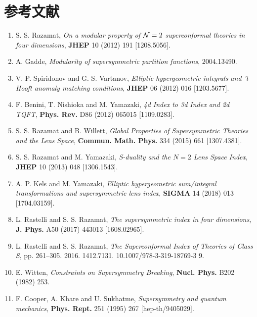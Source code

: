 \section{参考文献}
\begin{enumerate}
\item[{[1]}] S. S. Razamat, \textit{On a modular property of $\mathcal{N}=2$ superconformal theories in four dimensions}, \textbf{JHEP} 10 (2012) 191 [1208.5056].
\item[{[2]}] A. Gadde, \textit{Modularity of supersymmetric partition functions}, 2004.13490.
\item[{[3]}] V. P. Spiridonov and G. S. Vartanov, \textit{Elliptic hypergeometric integrals and 't Hooft anomaly matching conditions}, \textbf{JHEP} 06 (2012) 016 [1203.5677].
\item[{[4]}] F. Benini, T. Nishioka and M. Yamazaki, \textit{4d Index to 3d Index and 2d TQFT}, \textbf{Phys. Rev.} D86 (2012) 065015 [1109.0283].
\item[{[5]}] S. S. Razamat and B. Willett, \textit{Global Properties of Supersymmetric Theories and the Lens Space}, \textbf{Commun. Math. Phys.} 334 (2015) 661 [1307.4381].
\item[{[6]}] S. S. Razamat and M. Yamazaki, \textit{S-duality and the $N=2$ Lens Space Index}, \textbf{JHEP} 10 (2013) 048 [1306.1543].
\item[{[7]}] A. P. Kels and M. Yamazaki, \textit{Elliptic hypergeometric sum/integral transformations and supersymmetric lens index}, \textbf{SIGMA} 14 (2018) 013 [1704.03159].
\item[{[8]}] L. Rastelli and S. S. Razamat, \textit{The supersymmetric index in four dimensions}, \textbf{J. Phys.} A50 (2017) 443013 [1608.02965].
\item[{[9]}] L. Rastelli and S. S. Razamat, \textit{The Superconformal Index of Theories of Class S}, pp. 261--305. 2016. 1412.7131. 10.1007/978-3-319-18769-3 9.
\item[{[10]}] E. Witten, \textit{Constraints on Supersymmetry Breaking}, \textbf{Nucl. Phys.} B202 (1982) 253.
\item[{[11]}] F. Cooper, A. Khare and U. Sukhatme, \textit{Supersymmetry and quantum mechanics}, \textbf{Phys. Rept.} 251 (1995) 267 [hep-th/9405029].

\end{enumerate}
